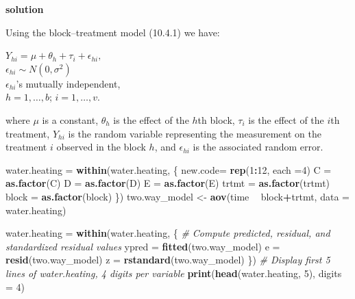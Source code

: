 \documentclass[12pt,]{article}
\newenvironment{Shaded}{\begin{snugshade}}{\end{snugshade}}
\newcommand{\KeywordTok}[1]{\textcolor[rgb]{0.13,0.29,0.53}{\textbf{#1}}}
\newcommand{\DataTypeTok}[1]{\textcolor[rgb]{0.13,0.29,0.53}{#1}}
\newcommand{\DecValTok}[1]{\textcolor[rgb]{0.00,0.00,0.81}{#1}}
\newcommand{\StringTok}[1]{\textcolor[rgb]{0.31,0.60,0.02}{#1}}
\newcommand{\CommentTok}[1]{\textcolor[rgb]{0.56,0.35,0.01}{\textit{#1}}}
\newcommand{\OperatorTok}[1]{\textcolor[rgb]{0.81,0.36,0.00}{\textbf{#1}}}
\newcommand{\NormalTok}[1]{#1}
\begin{document}
\textbf{solution}

Using the block--treatment model (10.4.1) we have:

\begin{center}
$Y_{hi} = \mu + \theta_h + \tau_i + \epsilon_{hi},$\\
$\epsilon_{hi} \sim N(0,\sigma^2)$\\
$\epsilon_{hi}$'s mutually independent,\\
$h = 1,\ldots, b$; $i = 1, \ldots , v$.
\end{center}

where \(\mu\) is a constant, \(\theta_h\) is the effect of the \(h\)th
block, \(\tau_i\) is the effect of the \(i\)th treatment, \(Y_{hi}\) is
the random variable representing the measurement on the treatment \(i\)
observed in the block \(h\), and \(\epsilon_{hi}\) is the associated
random error.

\begin{Shaded}
\begin{Highlighting}[]
\NormalTok{water.heating =}\StringTok{ }\KeywordTok{within}\NormalTok{(water.heating, \{}
\NormalTok{  new.code=}\StringTok{ }\KeywordTok{rep}\NormalTok{(}\DecValTok{1}\OperatorTok{:}\DecValTok{12}\NormalTok{, }\DataTypeTok{each =}\DecValTok{4}\NormalTok{)}
\NormalTok{  C =}\StringTok{ }\KeywordTok{as.factor}\NormalTok{(C)}
\NormalTok{  D =}\StringTok{ }\KeywordTok{as.factor}\NormalTok{(D)}
\NormalTok{  E =}\StringTok{ }\KeywordTok{as.factor}\NormalTok{(E)}
\NormalTok{  trtmt =}\StringTok{ }\KeywordTok{as.factor}\NormalTok{(trtmt)}
\NormalTok{  block =}\StringTok{ }\KeywordTok{as.factor}\NormalTok{(block)}
\NormalTok{  \})}
\NormalTok{two.way_model <-}\StringTok{ }\KeywordTok{aov}\NormalTok{(time }\OperatorTok{~}\StringTok{ }\NormalTok{block}\OperatorTok{+}\NormalTok{trtmt, }\DataTypeTok{data =}\NormalTok{ water.heating)}

\NormalTok{water.heating =}\StringTok{ }\KeywordTok{within}\NormalTok{(water.heating, \{}
  \CommentTok{# Compute predicted, residual, and standardized residual values}
\NormalTok{  ypred =}\StringTok{ }\KeywordTok{fitted}\NormalTok{(two.way_model)}
\NormalTok{  e =}\StringTok{ }\KeywordTok{resid}\NormalTok{(two.way_model) }
\NormalTok{  z =}\StringTok{ }\KeywordTok{rstandard}\NormalTok{(two.way_model)}
\NormalTok{  \})}
\CommentTok{# Display first 5 lines of water.heating, 4 digits per variable}
\KeywordTok{print}\NormalTok{(}\KeywordTok{head}\NormalTok{(water.heating, }\DecValTok{5}\NormalTok{), }\DataTypeTok{digits =} \DecValTok{4}\NormalTok{)}
\end{Highlighting}
\end{Shaded}
\end{document}
